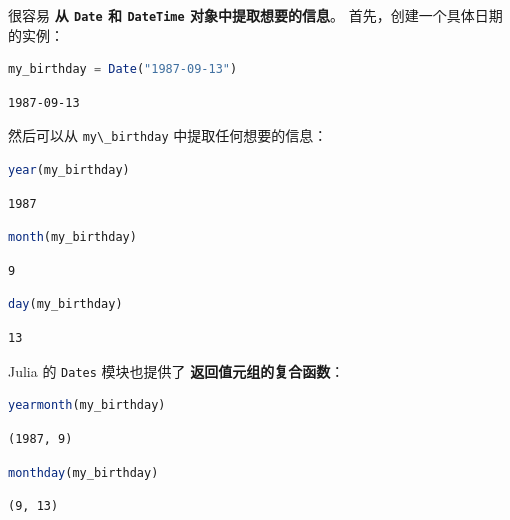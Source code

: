 \documentclass[
  notoc %
]{tufte-book}
\newcommand{\passthrough}[1]{#1}
\begin{document}
很容易 \textbf{从 \passthrough{\lstinline!Date!} 和
\passthrough{\lstinline!DateTime!} 对象中提取想要的信息}。
首先，创建一个具体日期的实例：

\begin{lstlisting}[language=Julia]
my_birthday = Date("1987-09-13")
\end{lstlisting}

\begin{lstlisting}[language=Output]
1987-09-13
\end{lstlisting}

然后可以从 \passthrough{\lstinline!my\_birthday!} 中提取任何想要的信息：

\begin{lstlisting}[language=Julia]
year(my_birthday)
\end{lstlisting}

\begin{lstlisting}[language=Output]
1987
\end{lstlisting}

\begin{lstlisting}[language=Julia]
month(my_birthday)
\end{lstlisting}

\begin{lstlisting}[language=Output]
9
\end{lstlisting}

\begin{lstlisting}[language=Julia]
day(my_birthday)
\end{lstlisting}

\begin{lstlisting}[language=Output]
13
\end{lstlisting}

Julia 的 \passthrough{\lstinline!Dates!} 模块也提供了
\textbf{返回值元组的复合函数}：

\begin{lstlisting}[language=Julia]
yearmonth(my_birthday)
\end{lstlisting}

\begin{lstlisting}[language=Output]
(1987, 9)
\end{lstlisting}

\begin{lstlisting}[language=Julia]
monthday(my_birthday)
\end{lstlisting}

\begin{lstlisting}[language=Output]
(9, 13)
\end{lstlisting}
\end{document}
